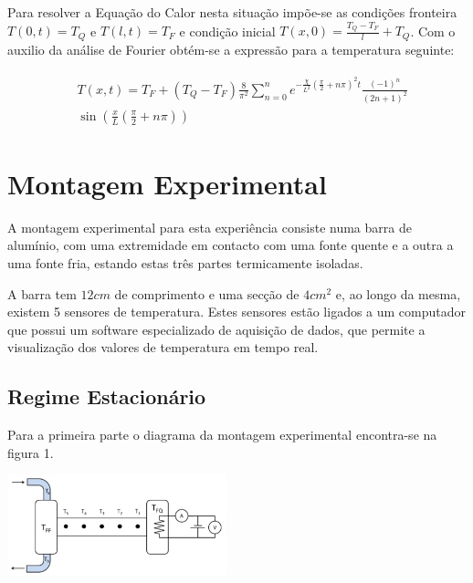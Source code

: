 \documentclass[8pt]{extarticle}
\begin{document}
\begin{multicols}{2}
\par Para resolver a Equação do Calor nesta situação impõe-se as condições fronteira $T(0,t) = T_{Q}$ e $T(l,t) = T_{F}$ e condição inicial $T(x,0) = \frac{T_{Q} - T_{F}}{l} + T_{Q}$. Com o auxilio da análise de Fourier obtém-se a expressão para a temperatura seguinte:

\begin{eqnarray}
\begin{split}
& T(x,t)= T_{F} + (T_{Q} - T_{F})\frac{8}{\pi ^2}\sum_{n=0}^{n} e^{-\frac{\chi}{L^2}(\frac{\pi}{2} + n\pi)^2 t}  \frac{(-1)^n}{(2n+1)^2} \\
&\sin \left(\frac{x}{L}\left(\frac{\pi}{2} + n\pi \right)\right)
\end{split}
\end{eqnarray}

\section{Montagem Experimental}

\par A montagem experimental para esta experiência consiste numa barra de alumínio, com uma extremidade em contacto com uma fonte quente e a outra a uma fonte fria, estando estas três partes termicamente isoladas.
\par A barra tem $12cm$ de comprimento e uma secção de $4cm^2$ e, ao longo da mesma, existem 5 sensores de temperatura. Estes sensores estão ligados a um computador que possui um software especializado de aquisição de dados, que permite a visualização dos valores de temperatura em tempo real.

\subsection*{Regime Estacionário}
Para a primeira parte o diagrama da montagem experimental encontra-se na figura 1. 

\begin{center}
\includegraphics[width=180pt]{figura1.jpg}
\par{}
\end{center}


\end{multicols}
\end{document}
